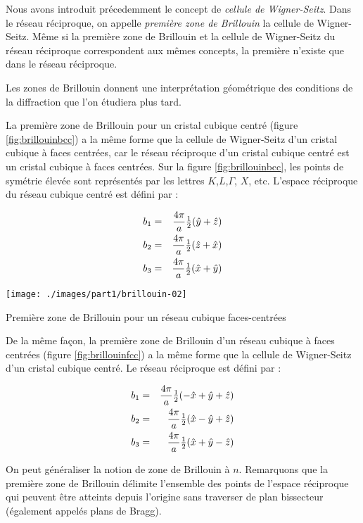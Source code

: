 Nous avons introduit précedemment le concept de \emph{cellule de Wigner-Seitz}. Dans le réseau réciproque, on appelle \emph{première zone de Brillouin} la cellule de Wigner-Seitz.
Même si la première zone de Brillouin et la cellule de Wigner-Seitz du réseau réciproque correspondent aux mêmes concepts, la première n'existe que dans le réseau réciproque.

Les zones de Brillouin donnent une interprétation géométrique des conditions de la diffraction que l'on étudiera plus tard.

La première zone de Brillouin pour un cristal cubique centré (figure \ref{fig:brillouinbcc}) a la même forme que la cellule de Wigner-Seitz d'un cristal cubique à faces centrées, car le réseau réciproque d'un cristal cubique centré est un cristal cubique à faces centrées. Sur la figure \ref{fig:brillouinbcc}, les points de symétrie élevée sont représentés par les lettres $K$,$L$,$\Gamma$, $X$, etc. L'espace réciproque du réseau cubique centré est défini par :

\begin{eqnarray}
    b_1 & = & \frac{4\pi}{a} \mbox{$\frac{1}{2}$} (\hat{y} + \hat{z})\\
    b_2 & = & \frac{4\pi}{a} \mbox{$\frac{1}{2}$} (\hat{z} + \hat{x})\\
    b_3 & = & \frac{4\pi}{a} \mbox{$\frac{1}{2}$} (\hat{x} + \hat{y})
\end{eqnarray}
    
\begin{marginfigure}
\texttt{[image: ./images/part1/brillouin-02]}
\caption{Première zone de Brillouin pour un réseau cubique faces-centrées}
\label{fig:brillouinfcc}
\end{marginfigure}

De la même façon, la première zone de Brillouin d'un réseau cubique à faces centrées (figure \ref{fig:brillouinfcc}) a la même forme que la cellule de Wigner-Seitz d'un cristal cubique centré. Le réseau réciproque est défini par :

\begin{eqnarray}
    b_1 & = & \frac{4\pi}{a} \mbox{$\frac{1}{2}$} (-\hat{x} + \hat{y} + \hat{z})\\
    b_2 & = & \frac{4\pi}{a} \mbox{$\frac{1}{2}$} (\hat{x} - \hat{y} + \hat{z})\\
    b_3 & = & \frac{4\pi}{a} \mbox{$\frac{1}{2}$} (\hat{x} + \hat{y} - \hat{z})
\end{eqnarray}

On peut généraliser la notion de zone de Brillouin à $n$. Remarquons que la première zone de Brillouin délimite l'ensemble des points de l'espace réciproque qui peuvent être atteints depuis l'origine sans traverser de plan bissecteur (également appelés plans de Bragg).

